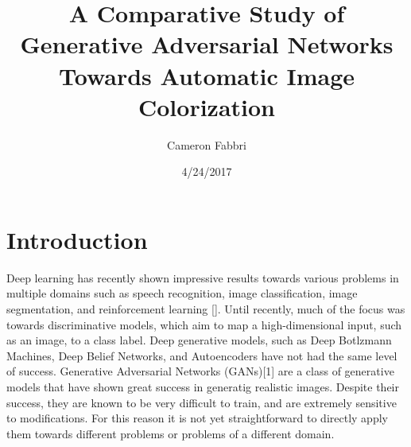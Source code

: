 \documentclass{article}
\begin{document}
\title{A Comparative Study of Generative Adversarial Networks Towards Automatic Image Colorization}

\author{Cameron Fabbri}
\date{4/24/2017}

\maketitle



\section{Introduction}
Deep learning has recently shown impressive results towards various problems in multiple domains such as speech recognition,
image classification, image segmentation, and reinforcement learning []. Until recently, much of the focus was towards
discriminative models, which aim to map a high-dimensional input, such as an image, to a class label. Deep generative models,
such as Deep Botlzmann Machines, Deep Belief Networks, and Autoencoders have not had the same level of success.
Generative Adversarial Networks (GANs)[1] are a class of generative models that have shown great success in generatig realistic
images. Despite their success, they are known to be very difficult to train, and are extremely sensitive to modifications.
For this reason it is not yet straightforward to directly apply them towards different problems or problems of a different domain.\newline
\end{document}
